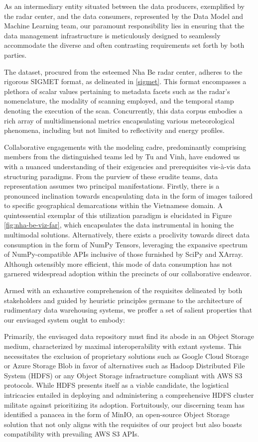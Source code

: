 As an intermediary entity situated between the data producers, exemplified by
the radar center, and the data consumers, represented by the Data Model and
Machine Learning team, our paramount responsibility lies in ensuring that the
data management infrastructure is meticulously designed to seamlessly
accommodate the diverse and often contrasting requirements set forth by both
parties.

The dataset, procured from the esteemed Nha Be radar center, adheres to the
rigorous SIGMET format, as delineated in \ref{sigmet}. This format encompasses a
plethora of scalar values pertaining to metadata facets such as the radar's
nomenclature, the modality of scanning employed, and the temporal stamp denoting
the execution of the scan. Concurrently, this data corpus embodies a rich array
of multidimensional metrics encapsulating various meteorological phenomena,
including but not limited to reflectivity and energy profiles.

Collaborative engagements with the modeling cadre, predominantly comprising
members from the distinguished teams led by Tu and Vinh, have endowed us with a
nuanced understanding of their exigencies and prerequisites vis-à-vis data
structuring paradigms. From the purview of these erudite teams, data
representation assumes two principal manifestations. Firstly, there is a
pronounced inclination towards encapsulating data in the form of images tailored
to specific geographical demarcations within the Vietnamese domain. A
quintessential exemplar of this utilization paradigm is elucidated in Figure
\ref{fig:nha-be-viz-far}, which encapsulates the data instrumental in honing the
multimodal solutions. Alternatively, there exists a proclivity towards direct
data consumption in the form of NumPy Tensors, leveraging the expansive spectrum
of NumPy-compatible APIs inclusive of those furnished by SciPy and XArray.
Although ostensibly more efficient, this mode of data consumption has not
garnered widespread adoption within the precincts of our collaborative endeavor.

Armed with an exhaustive comprehension of the requisites delineated by both
stakeholders and guided by heuristic principles germane to the architecture of
rudimentary data warehousing systems, we proffer a set of salient properties
that our envisaged system ought to embody:

Primarily, the envisaged data repository must find its abode in an Object
Storage medium, characterized by maximal interoperability with extant systems.
This necessitates the exclusion of proprietary solutions such as Google Cloud
Storage or Azure Storage Blob in favor of alternatives such as Hadoop
Distributed File System (HDFS) \cite{HDFS} or any Object Storage infrastructure compliant
with AWS S3 protocols. While HDFS presents itself as a viable candidate, the
logistical intricacies entailed in deploying and administering a comprehensive
HDFS cluster militate against prioritizing its adoption. Fortuitously, our
discerning team has identified a panacea in the form of MinIO, an open-source
Object Storage solution that not only aligns with the requisites of our project
but also boasts compatibility with prevailing AWS S3 APIs.

